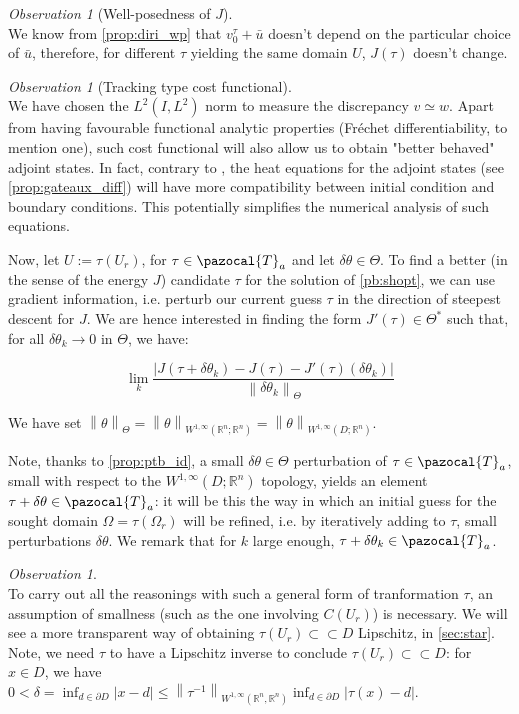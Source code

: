\documentclass[english,a4paper,9pt,oneside]{scrbook}	%
\theoremstyle{break}
\theoremstyle{remark}
\newtheorem{obs}[equation]{Observation}
\newcommand{\mR}{\mathbb{R}}
\newcommand{\norm}[1]{\left\lVert#1\right\rVert}
\newcommand{\cc}{\subset\subset}
\newcommand{\cT}{\pazocal{T}}
\newcommand{\te}{\theta}
\newcommand{\Te}{\Theta}
\begin{document}
\begin{obs}[Well-posedness of $J$]
\mbox{}\\
We know from \cref{prop:diri_wp} that $v_0^\tau + \bar{u}$ doesn't depend on the particular choice of $\bar{u}$, therefore, for different $\tau$ yielding the same domain $U$, $J(\tau)$ doesn't change.

\end{obs}

\begin{obs}[Tracking type cost functional]
\mbox{}\\
We have chosen the $L^2(I,L^2)$ norm to measure the discrepancy $v\simeq w$. Apart from having favourable functional analytic properties (Fréchet differentiability, to mention one), such cost functional will also allow us to obtain "better behaved" adjoint states. In fact, contrary to \cite{harbrecht}, the heat equations for the adjoint states (see \cref{prop:gateaux_diff}) will have more compatibility between initial condition and boundary conditions. This potentially simplifies the numerical analysis of such equations.
\end{obs}


Now, let $U:=\tau(U_r)$, for $\tau \in \cT_a$ and let $\delta \te \in \Te$. To find a better (in the sense of the energy $J$) candidate $\tau$ for the solution of \cref{pb:shopt}, we can use gradient information, i.e. perturb our current guess $\tau$ in the direction of steepest descent for $J$. We are hence interested in finding the form $J'(\tau) \in \Te^*$ such that, for all $\delta \te_k \rightarrow 0$ in $\Te$, we have:


$$\lim_{k}\frac{|J(\tau+\delta \te_k)-J(\tau)-J'(\tau)(\delta \te_k)|}{\norm{\delta \te_k}_{\Te}}$$

We have set $\norm{\te}_\Te = \norm{\te}_{W^{1,\infty}(\mR^n;\mR^n)}=\norm{\te}_{W^{1,\infty}(D;\mR^n)}$.

Note, thanks to \cref{prop:ptb_id}, a small $\delta \te \in \Te$ perturbation of $\tau \in \cT_a$, small with respect to the $W^{1,\infty}(D;\mR^n)$ topology, yields an element $\tau +\delta  \te \in \cT_a$: it will be this the way in which an initial guess for the sought domain $\Omega = \tau(\Omega_r)$ will be refined, i.e. by iteratively adding to $\tau$, small perturbations $\delta \te$. We remark that for $k$ large enough, $\tau+\delta \te_k \in \cT_a$.

\begin{obs}
\mbox{}\\
To carry out all the reasonings with such a general form of tranformation $\tau$, an assumption of smallness (such as the one involving $C(U_r)$) is necessary. We will see a more transparent way of obtaining $\tau(U_r)\cc D$ Lipschitz, in \cref{sec:star}.
\mbox{}\\
Note, we need $\tau$ to have a Lipschitz inverse to conclude $\tau(U_r)\cc D$: for $x \in D$, we have $0<\delta = \inf_{d \in \partial D}|x-d|\leq \norm{\tau^{-1}}_{W^{1,\infty}(\mR^n,\mR^n)}\inf_{d \in \partial D}|\tau(x)-d|$.
\end{obs}
\end{document}
